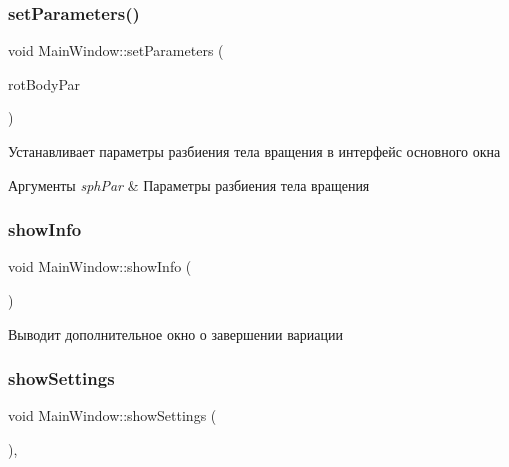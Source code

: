 \subsubsection{\texorpdfstring{set\+Parameters()}{setParameters()}\hspace{0.1cm}{\footnotesize\ttfamily [3/3]}}
{\footnotesize\ttfamily void Main\+Window\+::set\+Parameters (\begin{DoxyParamCaption}\item[{\mbox{\hyperlink{struct_rotation_body_parameters}{Rotation\+Body\+Parameters}} \&}]{rot\+Body\+Par }\end{DoxyParamCaption})\hspace{0.3cm}{\ttfamily [private]}}

Устанавливает параметры разбиения тела вращения в интерфейс основного окна 
\begin{DoxyParams}{Аргументы}
{\em sph\+Par} & Параметры разбиения тела вращения \\
\hline
\end{DoxyParams}
\mbox{\label{class_main_window_a75499d93be4aa10581e42eddd7ecd1f7}} 
\subsubsection{\texorpdfstring{show\+Info}{showInfo}}
{\footnotesize\ttfamily void Main\+Window\+::show\+Info (\begin{DoxyParamCaption}{ }\end{DoxyParamCaption})\hspace{0.3cm}{\ttfamily [slot]}}

Выводит дополнительное окно о завершении вариации \mbox{\label{class_main_window_aabfa36b35a25cafc7832c489f5bd30f2}} 
\subsubsection{\texorpdfstring{show\+Settings}{showSettings}}
{\footnotesize\ttfamily void Main\+Window\+::show\+Settings (\begin{DoxyParamCaption}{ }\end{DoxyParamCaption})\hspace{0.3cm}{\ttfamily [private]}, {\ttfamily [slot]}}

